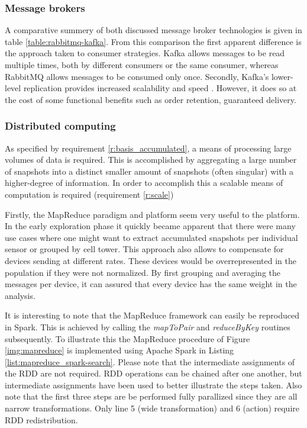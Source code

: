 \subsubsection*{Message brokers}

A comparative summery of both discussed message broker technologies is given in table \ref{table:rabbitmq-kafka}. From this comparison the first apparent difference is the approach taken to consumer strategies. Kafka allows messages to be read multiple times, both by different consumers or the same consumer, whereas RabbitMQ allows messages to be consumed only once. Secondly, Kafka's lower-level replication provides increased scalability and speed \cite{kafka_vs_rabbitmq}. However, it does so at the cost of some functional benefits such as order retention, guaranteed delivery.

\subsubsection{Distributed computing}
As specified by requirement \ref{r:basis_accumulated}, a means of processing large volumes of data is required. This is accomplished by aggregating a large number of snapshots into a distinct smaller amount of snapshots (often singular) with a higher-degree of information. In order to accomplish this a scalable means of computation is required (requirement \ref{r:scale}) 

Firstly, the MapReduce paradigm and platform seem very useful to the platform. In the early exploration phase it quickly became apparent that there were many use cases where one might want to extract accumulated snapshots per individual sensor or grouped by cell tower. This approach also allows to compensate for devices sending at different rates. These devices would be overrepresented in the population if they were not normalized. By first grouping and averaging the messages per device, it can assured that every device has the same weight in the analysis.




It is interesting to note that the MapReduce framework can easily be reproduced in Spark. This is achieved by calling the \emph{mapToPair} and \emph{reduceByKey} routines subsequently. To illustrate this the MapReduce procedure of Figure \ref{img:mapreduce} is implemented using Apache Spark in Listing \ref{list:mapreduce_spark-search}. Please note that the intermediate assignments of the RDD are not required. RDD operations can be chained after one another, but intermediate assignments have been used to better illustrate the steps taken. Also note that the first three steps are be performed fully parallized since they are all narrow transformations. Only line 5 (wide transformation) and 6 (action) require RDD redistribution.

